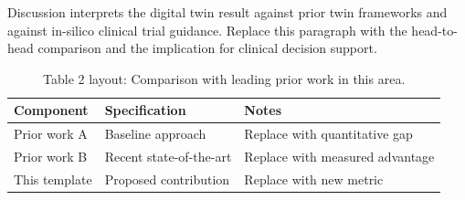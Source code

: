 
Discussion interprets the digital twin result against prior twin frameworks and against in-silico clinical trial guidance. Replace this paragraph with the head-to-head comparison and the implication for clinical decision support.

\begin{table}[H]
\caption{Table 2 layout: Comparison with leading prior work in this area.}
\label{tab:discussion_compare}
\centering
\begin{tabular}{>{\raggedright\arraybackslash}p{3.4cm} >{\raggedright\arraybackslash}p{4.6cm} >{\raggedright\arraybackslash}p{5.4cm}}
\toprule
\textbf{Component} & \textbf{Specification} & \textbf{Notes} \\
\midrule
  Prior work A & Baseline approach & Replace with quantitative gap \\
  Prior work B & Recent state-of-the-art & Replace with measured advantage \\
  This template & Proposed contribution & Replace with new metric \\
\bottomrule
\end{tabular}
\end{table}
